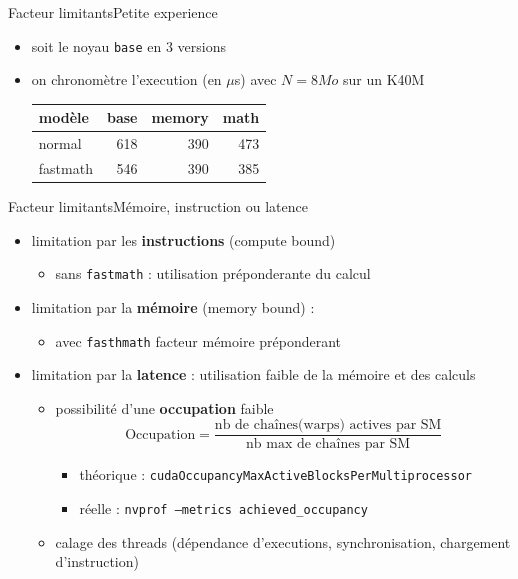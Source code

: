 \documentclass[11pt,mathserif]{beamer}
\begin{document}
\begin{frame}{Facteur limitants}{Petite experience}
  \begin{itemize}[<+->]
    \item soit le noyau \texttt{base} en 3 versions
      
    \item on chronomètre l'execution (en $\mu$s) avec $N=8Mo$ sur un K40M
      \begin{center}
        \begin{tabular}{|l|r|r|r|}
          \hline
          modèle    & base    & memory & math  \\ 
          \hline
          normal    &  618    &  390   &  473\\ 
          fastmath  &  546    &  390   &  385 \\ 
          \hline
        \end{tabular}
      \end{center}
  \end{itemize}
\end{frame}

\begin{frame}{Facteur limitants}{Mémoire, instruction ou latence}
  \begin{itemize}[<+->]
    \item limitation par les {\bf instructions} (compute bound) 
      \begin{itemize}
        \item sans {\tt fastmath} : utilisation préponderante du calcul
      \end{itemize}
    \item limitation par la {\bf mémoire } (memory bound) : 
      \begin{itemize}
        \item avec {\tt fasthmath} facteur mémoire préponderant
      \end{itemize}
    \item limitation par la {\bf latence} : utilisation faible de la mémoire et des calculs
      \begin{itemize}
        \item possibilité d'une {\bf occupation} faible 
          $$ \mbox{Occupation} = \frac{\mbox{nb de chaînes(warps) actives par SM}}{\mbox{nb max de chaînes par SM}} $$
      \begin{itemize}
        \item théorique : {\tt cudaOccupancyMaxActiveBlocksPerMultiprocessor }
        \item réelle : {\tt nvprof --metrics achieved\_occupancy }
      \end{itemize}
        \item calage des threads (dépendance d'executions, synchronisation, chargement d'instruction)
      \end{itemize}
\end{itemize}
\end{frame}
\end{document}
